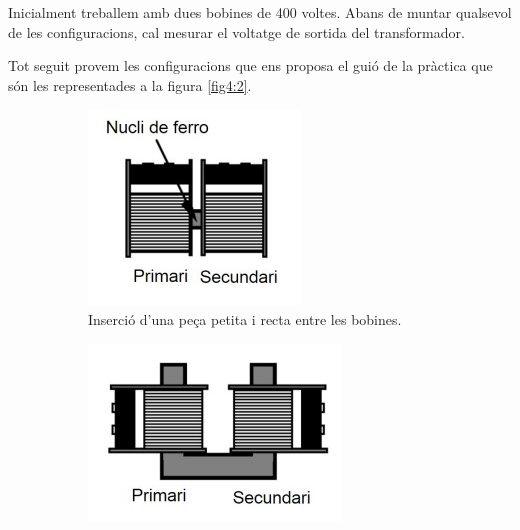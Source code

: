 \documentclass[a4paper,10.5pt]{report}
\begin{document}
Inicialment treballem amb dues bobines de 400 voltes. Abans de muntar qualsevol de les configuracions, cal mesurar el voltatge de sortida del transformador.

Tot seguit provem les configuracions que ens proposa el guió de la pràctica que són les representades a la figura \ref{fig4:2}.

\begin{figure}[h]
	\centering
	\begin{subfigure}[b]{0.22\textwidth}
		\centering
		\includegraphics[width=\textwidth]{42a.jpg}
		\caption{Inserció d'una peça petita i recta entre les bobines.}
		\label{fig4:2a}
	\end{subfigure}
	\hspace{0.4cm}
	\begin{subfigure}[b]{0.22\textwidth}
		\centering
		\includegraphics[width=\textwidth]{42b.jpg}

\end{subfigure}
\end{figure}
\end{document}
